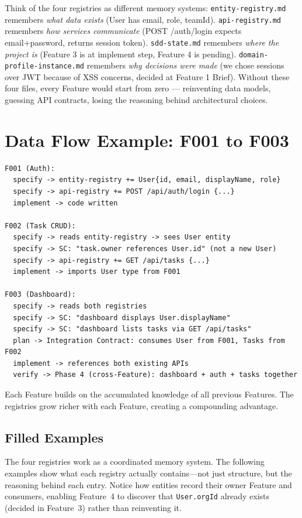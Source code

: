 \documentclass[11pt,a4paper,openright,twoside]{report}
\begin{document}
Think of the four registries as different memory systems: \texttt{entity-registry.md} remembers \emph{what data exists} (User has email, role, teamId). \texttt{api-registry.md} remembers \emph{how services communicate} (POST /auth/login expects email+password, returns session token). \texttt{sdd-state.md} remembers \emph{where the project is} (Feature 3 is at implement step, Feature 4 is pending). \texttt{domain-profile-instance.md} remembers \emph{why decisions were made} (we chose sessions over JWT because of XSS concerns, decided at Feature 1 Brief). Without these four files, every Feature would start from zero --- reinventing data models, guessing API contracts, losing the reasoning behind architectural choices.

\section{Data Flow Example: F001 to F003}

\begin{lstlisting}[title={Cross-Feature Data Flow}]
F001 (Auth):
  specify -> entity-registry += User{id, email, displayName, role}
  specify -> api-registry += POST /api/auth/login {...}
  implement -> code written

F002 (Task CRUD):
  specify -> reads entity-registry -> sees User entity
  specify -> SC: "task.owner references User.id" (not a new User)
  specify -> api-registry += GET /api/tasks {...}
  implement -> imports User type from F001

F003 (Dashboard):
  specify -> reads both registries
  specify -> SC: "dashboard displays User.displayName"
  specify -> SC: "dashboard lists tasks via GET /api/tasks"
  plan -> Integration Contract: consumes User from F001, Tasks from F002
  implement -> references both existing APIs
  verify -> Phase 4 (cross-Feature): dashboard + auth + tasks together
\end{lstlisting}

Each Feature builds on the accumulated knowledge of all previous Features. The registries grow richer with each Feature, creating a compounding advantage.

\subsection{Filled Examples}

The four registries work as a coordinated memory system. The following examples show what each registry actually contains---not just structure, but the reasoning behind each entry. Notice how entities record their owner Feature and consumers, enabling Feature~4 to discover that \texttt{User.orgId} already exists (decided in Feature~3) rather than reinventing it.
\end{document}
